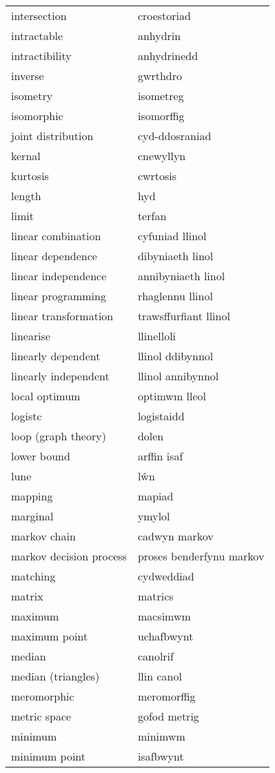 \begin{supertabular}{p{0.22\textwidth}p{0.22\textwidth}}
intersection & croestoriad \\
intractable & anhydrin \\
intractibility & anhydrinedd \\
inverse & gwrthdro \\
isometry & isometreg \\
isomorphic & isomorffig \\
joint distribution & cyd-ddosraniad \\
kernal & cnewyllyn \\
kurtosis & cwrtosis \\
length & hyd \\
limit & terfan \\
linear combination & cyfuniad llinol \\
linear dependence & dibyniaeth linol \\
linear independence & annibyniaeth linol \\
linear programming & rhaglennu llinol \\
linear transformation & trawsffurfiant llinol \\
linearise & llinelloli \\
linearly dependent & llinol ddibynnol \\
linearly independent & llinol annibynnol \\
local optimum & optimwm lleol \\
logistc & logistaidd \\
loop (graph theory) & dolen \\
lower bound & arffin isaf \\
lune & lŵn \\
mapping & mapiad \\
marginal & ymylol \\
markov chain & cadwyn markov \\
markov decision process & proses benderfynu markov \\
matching & cydweddiad \\
matrix & matrics \\
maximum & macsimwm \\
maximum point & uchafbwynt \\
median & canolrif \\
median (triangles) & llin canol \\
meromorphic & meromorffig \\
metric space & gofod metrig \\
minimum & minimwm \\
minimum point & isafbwynt \\

\end{supertabular}
